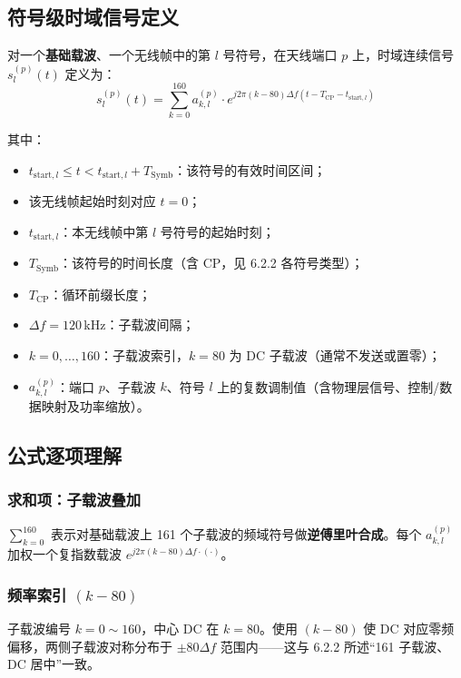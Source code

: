 \documentclass[11pt,a4paper]{ctexart}
\begin{document}
\subsection{符号级时域信号定义}

对一个\textbf{基础载波}、一个无线帧中的第 $l$ 号符号，在天线端口 $p$ 上，时域连续信号 $s_l^{(p)}(t)$ 定义为：
\begin{equation}
s_l^{(p)}(t)=\sum_{k=0}^{160}a_{k,l}^{(p)}\cdot
e^{j2\pi(k-80)\Delta f\left(t-T_{\mathrm{CP}}-t_{\mathrm{start},l}\right)}
\end{equation}

其中：
\begin{itemize}
  \item $t_{\mathrm{start},l}\le t < t_{\mathrm{start},l}+T_{\mathrm{Symb}}$：该符号的有效时间区间；
  \item 该无线帧起始时刻对应 $t=0$；
  \item $t_{\mathrm{start},l}$：本无线帧中第 $l$ 号符号的起始时刻；
  \item $T_{\mathrm{Symb}}$：该符号的时间长度（含 CP，见 6.2.2 各符号类型）；
  \item $T_{\mathrm{CP}}$：循环前缀长度；
  \item $\Delta f=120$\,kHz：子载波间隔；
  \item $k=0,\ldots,160$：子载波索引，$k=80$ 为 DC 子载波（通常不发送或置零）；
  \item $a_{k,l}^{(p)}$：端口 $p$、子载波 $k$、符号 $l$ 上的复数调制值（含物理层信号、控制/数据映射及功率缩放）。
\end{itemize}

\subsection{公式逐项理解}

\subsubsection{求和项：子载波叠加}

$\sum_{k=0}^{160}$ 表示对基础载波上 161 个子载波的频域符号做\textbf{逆傅里叶合成}。每个 $a_{k,l}^{(p)}$ 加权一个复指数载波 $e^{j2\pi(k-80)\Delta f\cdot(\cdot)}$。

\subsubsection{频率索引 $(k-80)$}

子载波编号 $k=0\sim 160$，中心 DC 在 $k=80$。使用 $(k-80)$ 使 DC 对应零频偏移，两侧子载波对称分布于 $\pm 80\Delta f$ 范围内——这与 6.2.2 所述“161 子载波、DC 居中”一致。
\end{document}
